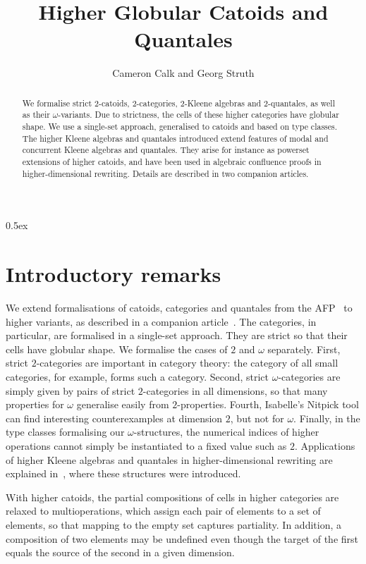 \documentclass[11pt,a4paper]{article}
\begin{document}
\title{Higher Globular Catoids and Quantales}
\author{Cameron Calk and Georg Struth}
\maketitle

\begin{abstract}
  We formalise strict $2$-catoids, $2$-categories, $2$-Kleene algebras
  and $2$-quantales, as well as their $\omega$-variants. Due to
  strictness, the cells of these higher categories have globular
  shape. We use a single-set approach, generalised to catoids and
  based on type classes. The higher Kleene algebras and quantales
  introduced extend features of modal and concurrent Kleene algebras
  and quantales. They arise for instance as powerset extensions of
  higher catoids, and have been used in algebraic confluence proofs in
  higher-dimensional rewriting. Details are described in two companion
  articles.
\end{abstract}

\tableofcontents

\parindent 0pt\parskip 0.5ex

\section{Introductory remarks}

We extend formalisations of catoids, categories and quantales from the
AFP~\cite{Struth23,Struth18,CalkS23} to higher variants, as described
in a companion article~\cite{CalkMPS23}. The categories, in
particular, are formalised in a single-set approach. They are strict
so that their cells have globular shape.  We formalise the cases of
$2$ and $\omega$ separately. First, strict $2$-categories are
important in category theory: the category of all small categories,
for example, forms such a category. Second, strict $\omega$-categories
are simply given by pairs of strict $2$-categories in all dimensions,
so that many properties for $\omega$ generalise easily from
$2$-properties. Fourth, Isabelle's Nitpick tool can find interesting
counterexamples at dimension $2$, but not for $\omega$.  Finally, in
the type classes formalising our $\omega$-structures, the numerical
indices of higher operations cannot simply be instantiated to a fixed
value such as $2$.  Applications of higher Kleene algebras and
quantales in higher-dimensional rewriting are explained
in~\cite{CalkGMS22}, where these structures were introduced.

With higher catoids, the partial compositions of cells in higher
categories are relaxed to multioperations, which assign each pair of
elements to a set of elements, so that mapping to the empty set
captures partiality. In addition, a composition of two elements may be
undefined even though the target of the first equals the source of the
second in a given dimension.





\end{document}
